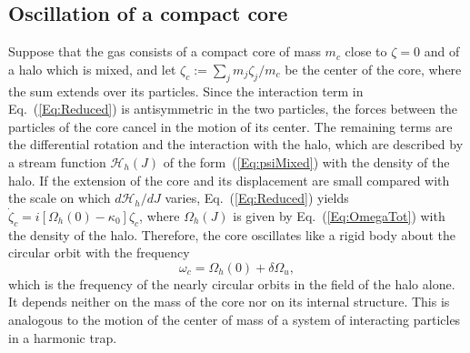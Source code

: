 \documentclass[prd,aps,nofootinbib,superscriptaddress,amsmath,amssymb]{revtex4}
\begin{document}
\subsection{Oscillation of a compact core}
\label{SubSec:Core}

Suppose that the gas consists of a compact core of mass $m_c$ close to $\zeta = 0$ and of a halo which is mixed, and let $\zeta_c := \sum_j m_j\zeta_j/m_c$ be the center of the core, where the sum extends over its particles. Since the interaction term in Eq.~(\ref{Eq:Reduced}) is antisymmetric in the two particles, the forces between the particles of the core cancel in the motion of its center. The remaining terms are the differential rotation and the interaction with the halo, which are described by a stream function $\mathcal{H}_h(J)$ of the form~(\ref{Eq:psiMixed}) with the density of the halo. If the extension of the core and its displacement are small compared with the scale on which $d\mathcal{H}_h/dJ$ varies, Eq.~(\ref{Eq:Reduced}) yields $\dot{\zeta}_c = i[\Omega_h(0) - \kappa_0]\zeta_c$, where $\Omega_h(J)$ is given by Eq.~(\ref{Eq:OmegaTot}) with the density of the halo. Therefore, the core oscillates like a rigid body about the circular orbit with the frequency
\begin{equation}
\omega_c = \Omega_h(0) + \delta\Omega_u,
\label{Eq:omegac}
\end{equation}
which is the frequency of the nearly circular orbits in the field of the halo alone. It depends neither on the mass of the core nor on its internal structure. This is analogous to the motion of the center of mass of a system of interacting particles in a harmonic trap.
\end{document}
